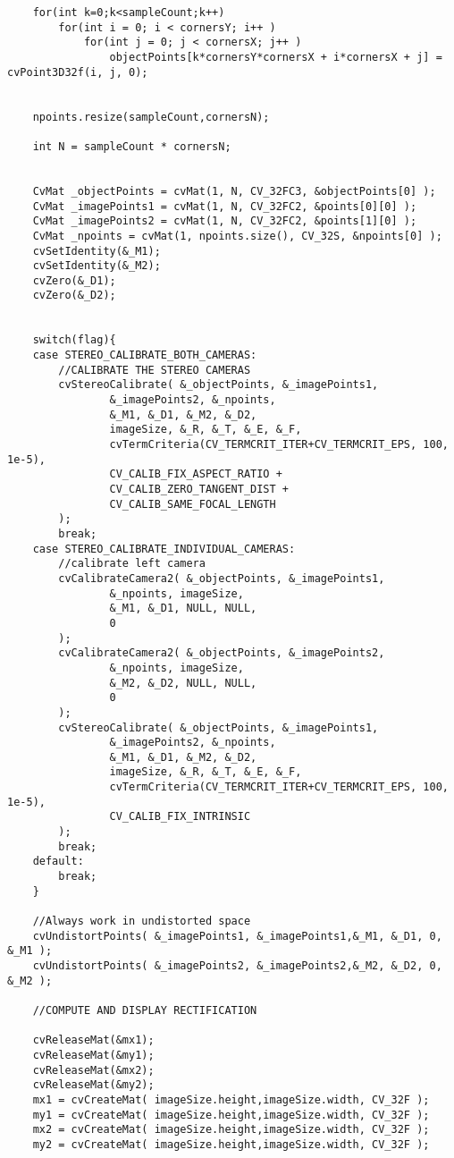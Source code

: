 \begin{lstlisting}
    for(int k=0;k<sampleCount;k++)
        for(int i = 0; i < cornersY; i++ )
            for(int j = 0; j < cornersX; j++ )
                objectPoints[k*cornersY*cornersX + i*cornersX + j] = cvPoint3D32f(i, j, 0);


    npoints.resize(sampleCount,cornersN);

    int N = sampleCount * cornersN;


    CvMat _objectPoints = cvMat(1, N, CV_32FC3, &objectPoints[0] );
    CvMat _imagePoints1 = cvMat(1, N, CV_32FC2, &points[0][0] );
    CvMat _imagePoints2 = cvMat(1, N, CV_32FC2, &points[1][0] );
    CvMat _npoints = cvMat(1, npoints.size(), CV_32S, &npoints[0] );
    cvSetIdentity(&_M1);
    cvSetIdentity(&_M2);
    cvZero(&_D1);
    cvZero(&_D2);


    switch(flag){
    case STEREO_CALIBRATE_BOTH_CAMERAS:
    	//CALIBRATE THE STEREO CAMERAS
    	cvStereoCalibrate( &_objectPoints, &_imagePoints1,
    			&_imagePoints2, &_npoints,
    			&_M1, &_D1, &_M2, &_D2,
    			imageSize, &_R, &_T, &_E, &_F,
    			cvTermCriteria(CV_TERMCRIT_ITER+CV_TERMCRIT_EPS, 100, 1e-5),
    			CV_CALIB_FIX_ASPECT_RATIO + 
                CV_CALIB_ZERO_TANGENT_DIST + 
                CV_CALIB_SAME_FOCAL_LENGTH
    	);
    	break;
    case STEREO_CALIBRATE_INDIVIDUAL_CAMERAS:
    	//calibrate left camera
    	cvCalibrateCamera2( &_objectPoints, &_imagePoints1,
    			&_npoints, imageSize,
    			&_M1, &_D1, NULL, NULL,
    			0
    	);
    	cvCalibrateCamera2( &_objectPoints, &_imagePoints2,
    			&_npoints, imageSize,
    			&_M2, &_D2, NULL, NULL,
    			0
    	);
    	cvStereoCalibrate( &_objectPoints, &_imagePoints1,
    			&_imagePoints2, &_npoints,
    			&_M1, &_D1, &_M2, &_D2,
    			imageSize, &_R, &_T, &_E, &_F,
    			cvTermCriteria(CV_TERMCRIT_ITER+CV_TERMCRIT_EPS, 100, 1e-5),
    			CV_CALIB_FIX_INTRINSIC
    	);
    	break;
    default:
    	break;
    }

    //Always work in undistorted space
    cvUndistortPoints( &_imagePoints1, &_imagePoints1,&_M1, &_D1, 0, &_M1 );
    cvUndistortPoints( &_imagePoints2, &_imagePoints2,&_M2, &_D2, 0, &_M2 );

    //COMPUTE AND DISPLAY RECTIFICATION

	cvReleaseMat(&mx1);
	cvReleaseMat(&my1);
	cvReleaseMat(&mx2);
	cvReleaseMat(&my2);
	mx1 = cvCreateMat( imageSize.height,imageSize.width, CV_32F );
	my1 = cvCreateMat( imageSize.height,imageSize.width, CV_32F );
	mx2 = cvCreateMat( imageSize.height,imageSize.width, CV_32F );
	my2 = cvCreateMat( imageSize.height,imageSize.width, CV_32F );


\end{lstlisting}
